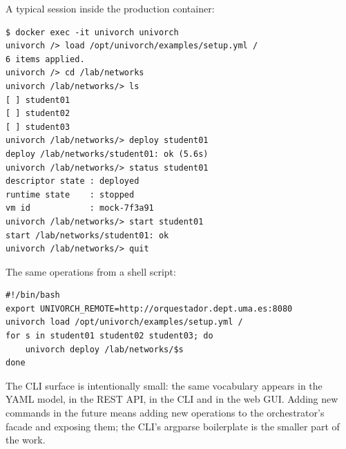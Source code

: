 A typical session inside the production container:

\begin{verbatim}
$ docker exec -it univorch univorch
univorch /> load /opt/univorch/examples/setup.yml /
6 items applied.
univorch /> cd /lab/networks
univorch /lab/networks/> ls
[ ] student01
[ ] student02
[ ] student03
univorch /lab/networks/> deploy student01
deploy /lab/networks/student01: ok (5.6s)
univorch /lab/networks/> status student01
descriptor state : deployed
runtime state    : stopped
vm id            : mock-7f3a91
univorch /lab/networks/> start student01
start /lab/networks/student01: ok
univorch /lab/networks/> quit
\end{verbatim}

The same operations from a shell script:

\begin{verbatim}
#!/bin/bash
export UNIVORCH_REMOTE=http://orquestador.dept.uma.es:8080
univorch load /opt/univorch/examples/setup.yml /
for s in student01 student02 student03; do
    univorch deploy /lab/networks/$s
done
\end{verbatim}

The CLI surface is intentionally small: the same vocabulary appears
in the YAML model, in the REST API, in the CLI and in the web GUI.
Adding new commands in the future means adding new operations to the
orchestrator's facade and exposing them; the CLI's argparse
boilerplate is the smaller part of the work.
